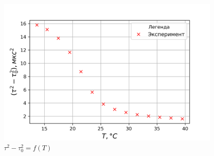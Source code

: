 \documentclass[a4paper, 12pt]{article}
\begin{document}
\begin{figure}[h]
\begin{center}
\includegraphics{graph1.png}
\end{center}
\caption{$\tau^2-\tau_0^2 = f(T)$}
\label{Period_graph1}
\end{figure}
\end{document}
